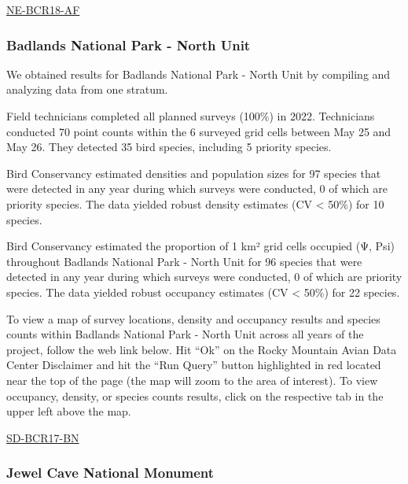 \documentclass[
  letterpaper,
  DIV=11,
  numbers=noendperiod,
  oneside]{scrreprt}
\begin{document}
\href{http://www.rmbo.org/new_site/adc/QueryWindow.aspx\#N4IgzgLgTghhCuBbEAuABCAcgUQLQCEBhAJQEYAOXAQQDF0qBzOAUzRoHswwBLAGzXzMAJmDSY43dgDsY/ALLSkzKRBABfIA}{NE-BCR18-AF}

\hypertarget{badlands-national-park---north-unit}{%
\subsubsection{Badlands National Park - North
Unit}\label{badlands-national-park---north-unit}}

We obtained results for Badlands National Park - North Unit by compiling
and analyzing data from one stratum.

Field technicians completed all planned surveys (100\%) in 2022.
Technicians conducted 70 point counts within the 6 surveyed grid cells
between May 25 and May 26. They detected 35 bird species, including 5
priority species.

Bird Conservancy estimated densities and population sizes for 97 species
that were detected in any year during which surveys were conducted, 0 of
which are priority species. The data yielded robust density estimates
(CV \textless{} 50\%) for 10 species.

Bird Conservancy estimated the proportion of 1 km² grid cells occupied
(Ψ, Psi) throughout Badlands National Park - North Unit for 96 species
that were detected in any year during which surveys were conducted, 0 of
which are priority species. The data yielded robust occupancy estimates
(CV \textless{} 50\%) for 22 species.

To view a map of survey locations, density and occupancy results and
species counts within Badlands National Park - North Unit across all
years of the project, follow the web link below. Hit ``Ok'' on the Rocky
Mountain Avian Data Center Disclaimer and hit the ``Run Query'' button
highlighted in red located near the top of the page (the map will zoom
to the area of interest). To view occupancy, density, or species counts
results, click on the respective tab in the upper left above the map.

\href{http://www.rmbo.org/new_site/adc/QueryWindow.aspx\#N4IgzgLgTghhCuBbEAuABCAygEQLQCEBhAJQEYB2AgOXXxgBMAbGAO3rDSrgEsB7FmIzQAFGFADWaXJ15QIACzQBVFtwggAvkA==}{SD-BCR17-BN}

\hypertarget{jewel-cave-national-monument}{%
\subsubsection{Jewel Cave National
Monument}\label{jewel-cave-national-monument}}
\end{document}
